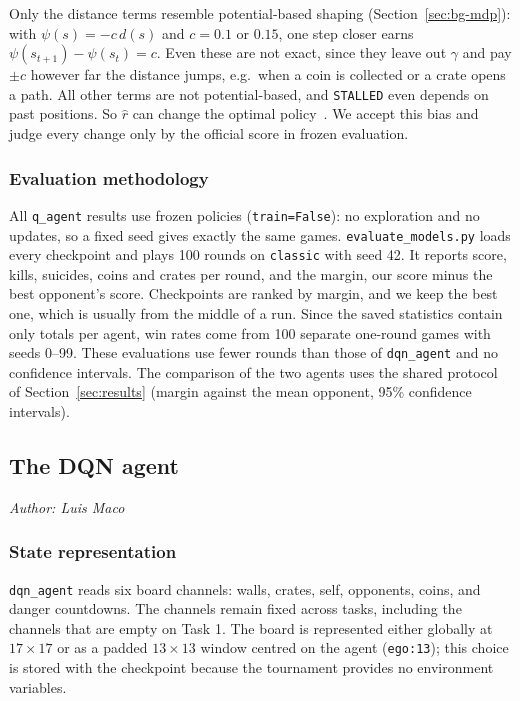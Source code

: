 \documentclass[11pt]{article}
\newcommand{\authorline}[1]{\noindent\textit{Author: #1}\par\medskip}
\newcommand{\code}[1]{\texttt{#1}}
\begin{document}
Only the distance terms resemble potential-based shaping (Section~\ref{sec:bg-mdp}):
with $\psi(s) = -c\,d(s)$ and $c = 0.1$ or $0.15$, one step closer earns
$\psi(s_{t+1}) - \psi(s_t) = c$. Even these are not exact, since they leave out
$\gamma$ and pay $\pm c$ however far the distance jumps, e.g.\ when a coin is collected
or a crate opens a path. All other terms are not potential-based, and \code{STALLED}
even depends on past positions. So $\hat r$ can change the optimal
policy~\cite{ng1999}. We accept this bias and judge every change only by the official
score in frozen evaluation.
 
\subsubsection{Evaluation methodology}
All \code{q\_agent} results use frozen policies (\code{train=False}): no exploration
and no updates, so a fixed seed gives exactly the same games. \code{evaluate\_models.py}
loads every checkpoint and plays 100 rounds on \code{classic} with seed 42. It reports
score, kills, suicides, coins and crates per round, and the margin, our score minus the
best opponent's score. Checkpoints are ranked by margin, and we keep the best one,
which is usually from the middle of a run. Since the saved statistics contain only
totals per agent, win rates come from 100 separate one-round games with seeds 0--99.
These evaluations use fewer rounds than those of \code{dqn\_agent} and no confidence
intervals. The comparison of the two agents uses the shared protocol of
Section~\ref{sec:results} (margin against the mean opponent, 95\% confidence intervals).

\subsection{The DQN agent}
\authorline{Luis Maco}

\subsubsection{State representation}

\code{dqn\_agent} reads six board channels: walls, crates, self, opponents, coins, and
danger countdowns. The channels remain fixed across tasks, including the channels that are
empty on Task 1. The board is represented either globally at $17\times17$ or as a padded
$13\times13$ window centred on the agent (\code{ego:13}); this choice is stored with the
checkpoint because the tournament provides no environment variables.
\end{document}
